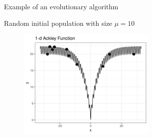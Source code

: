 \documentclass[11pt,compress,t,notes=noshow, xcolor=table]{beamer}
\begin{document}
\begin{vbframe}{Example of an evolutionary algorithm}

Random initial population with size $\mu = 10$

\medskip

\begin{center}
\begin{figure}
  \includegraphics[width=0.6\textwidth]{figure_man/1dim-ackley-func-2.png}
\end{figure}
\end{center}

\end{vbframe}


\end{document}

